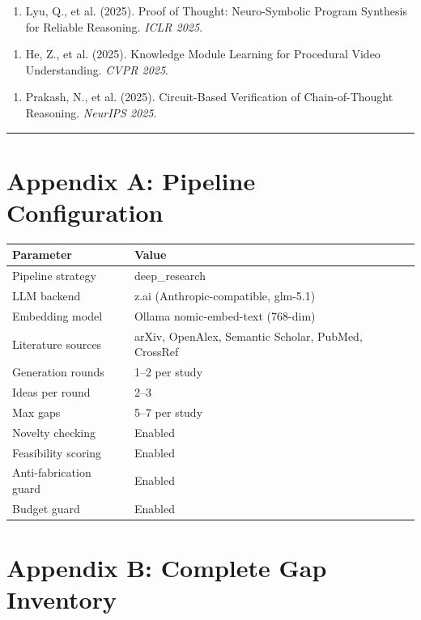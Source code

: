 \documentclass[11pt,a4paper]{article}
\begin{document}
\begin{enumerate}
  \item Lyu, Q., et al. (2025). Proof of Thought: Neuro-Symbolic Program Synthesis for Reliable Reasoning. \textit{ICLR 2025}.
\end{enumerate}

\begin{enumerate}
  \item He, Z., et al. (2025). Knowledge Module Learning for Procedural Video Understanding. \textit{CVPR 2025}.
\end{enumerate}

\begin{enumerate}
  \item Prakash, N., et al. (2025). Circuit-Based Verification of Chain-of-Thought Reasoning. \textit{NeurIPS 2025}.
\end{enumerate}

\noindent\rule{\textwidth}{0.4pt}

\section{Appendix A: Pipeline Configuration}

\begin{tabular}{|l|l|}
\hline
Parameter & Value \\
\hline
Pipeline strategy & deep_research \\
\hline
LLM backend & z.ai (Anthropic-compatible, glm-5.1) \\
\hline
Embedding model & Ollama nomic-embed-text (768-dim) \\
\hline
Literature sources & arXiv, OpenAlex, Semantic Scholar, PubMed, CrossRef \\
\hline
Generation rounds & 1–2 per study \\
\hline
Ideas per round & 2–3 \\
\hline
Max gaps & 5–7 per study \\
\hline
Novelty checking & Enabled \\
\hline
Feasibility scoring & Enabled \\
\hline
Anti-fabrication guard & Enabled \\
\hline
Budget guard & Enabled \\
\hline
\end{tabular}

\section{Appendix B: Complete Gap Inventory}
\end{document}
